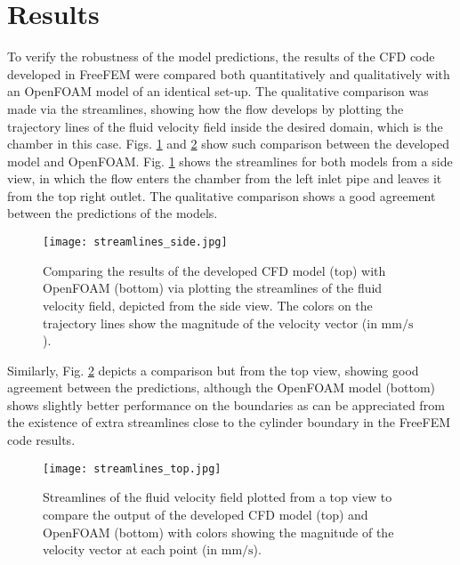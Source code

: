 \section{Results}

To verify the robustness of the model predictions, the results of the \gls{CFD} code developed in FreeFEM were compared both quantitatively and qualitatively with an OpenFOAM model of an identical set-up. The qualitative comparison was made via the streamlines, showing how the flow develops by plotting the trajectory lines of the fluid velocity field inside the desired domain, which is the chamber in this case. Figs. \ref{fig:fluid_streamlines_side} and \ref{fig:fluid_streamlines_top} show such comparison between the developed model and OpenFOAM. Fig. \ref{fig:fluid_streamlines_side} shows the streamlines for both models from a side view, in which the flow enters the chamber from the left inlet pipe and leaves it from the top right outlet. The qualitative comparison shows a good agreement between the predictions of the models.

\begin{figure}[h]
\centering
\medskip
\texttt{[image: streamlines\_side.jpg]}
\caption[Comparing streamline results of developed CFD code and OpenFOAM - side view]{Comparing the results of the developed \gls{CFD} model (top) with OpenFOAM (bottom) via plotting the streamlines of the fluid velocity field, depicted from the side view. The colors on the trajectory lines show the magnitude of the velocity vector (in $\mathrm{mm}/\mathrm{s}$).} \label{fig:fluid_streamlines_side}
\end{figure}

Similarly, Fig. \ref{fig:fluid_streamlines_top} depicts a comparison but from the top view, showing good agreement between the predictions, although the OpenFOAM model (bottom) shows slightly better performance on the boundaries as can be appreciated from the existence of extra streamlines close to the cylinder boundary in the FreeFEM code results.

\begin{figure}[h]
\centering
\medskip
\texttt{[image: streamlines\_top.jpg]}
\caption[Comparing streamline results of developed CFD code and OpenFOAM - top view]{Streamlines of the fluid velocity field plotted from a top view to compare the output of the developed \gls{CFD} model (top) and OpenFOAM (bottom)  with colors showing the magnitude of the velocity vector at each point (in $\mathrm{mm}/\mathrm{s}$).} \label{fig:fluid_streamlines_top}
\end{figure}

